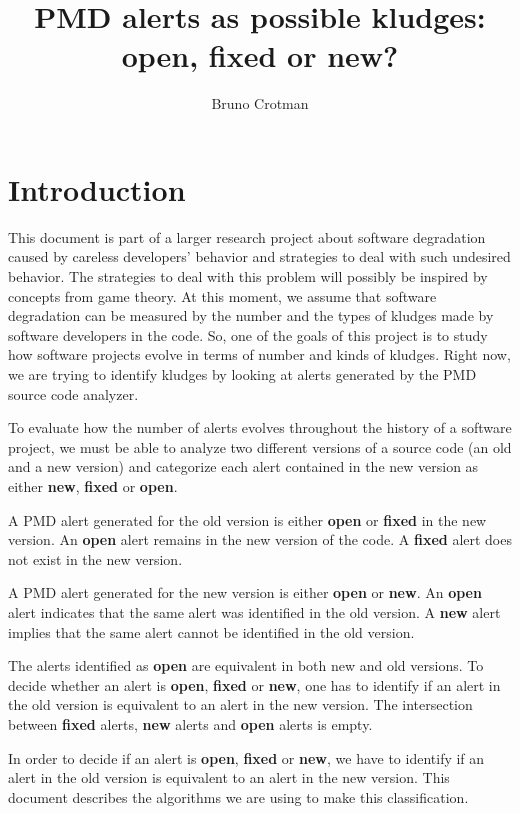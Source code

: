 \documentclass[
]{article}
\title{PMD alerts as possible kludges: open, fixed or new?}
\author{Bruno Crotman}
\date{}
\begin{document}
\maketitle

{
\setcounter{tocdepth}{3}
\tableofcontents
}
\small

\normalsize

\section{Introduction}\label{intro}

This document is part of a larger research project about software
degradation caused by careless developers' behavior and strategies to
deal with such undesired behavior. The strategies to deal with this
problem will possibly be inspired by concepts from game theory. At this
moment, we assume that software degradation can be measured by the
number and the types of kludges made by software developers in the code.
So, one of the goals of this project is to study how software projects
evolve in terms of number and kinds of kludges. Right now, we are trying
to identify kludges by looking at alerts generated by the PMD source
code analyzer.

To evaluate how the number of alerts evolves throughout the history of a
software project, we must be able to analyze two different versions of a
source code (an old and a new version) and categorize each alert
contained in the new version as either \textbf{new}, \textbf{fixed} or
\textbf{open}.

A PMD alert generated for the old version is either \textbf{open} or
\textbf{fixed} in the new version. An \textbf{open} alert remains in the
new version of the code. A \textbf{fixed} alert does not exist in the
new version.

A PMD alert generated for the new version is either \textbf{open} or
\textbf{new}. An \textbf{open} alert indicates that the same alert was
identified in the old version. A \textbf{new} alert implies that the
same alert cannot be identified in the old version.

The alerts identified as \textbf{open} are equivalent in both new and
old versions. To decide whether an alert is \textbf{open},
\textbf{fixed} or \textbf{new}, one has to identify if an alert in the
old version is equivalent to an alert in the new version. The
intersection between \textbf{fixed} alerts, \textbf{new} alerts and
\textbf{open} alerts is empty.

In order to decide if an alert is \textbf{open}, \textbf{fixed} or
\textbf{new}, we have to identify if an alert in the old version is
equivalent to an alert in the new version. This document describes the
algorithms we are using to make this classification.
\end{document}
